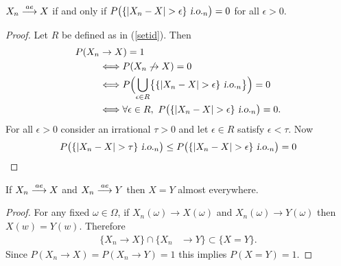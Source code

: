 \begin{theorem}[{\bf i.o. characterization}]\label{iochar}
$X_n\overset{\small ae} \longrightarrow X$ if and only if  $ P\bigl(\{|X_n - X| >\epsilon\} {\,\,\text{\sl i.o.} }_n\bigr) = 0$ for all $\epsilon >0$.
\end{theorem}
\begin{proof} Let $R$ be defined as in (\ref{setid}). Then
\begin{align*} 
P(X_n  &\rightarrow X )=1 \\
&\Longleftrightarrow P(X_n  \not\rightarrow X )= 0 \\
&\Longleftrightarrow  P\Bigl(\bigcup_{\epsilon \in R} \bigl\{\{|X_n - X| >\epsilon\} {\,\,\text{\sl i.o.} }_n \bigr\} \Bigr) = 0\\
&\Longleftrightarrow \forall \epsilon \in R,\,\,  P\bigl(\{|X_n - X| >\epsilon\} {\,\,\text{\sl i.o.} }_n\bigr) = 0.
\end{align*}
For all $\epsilon >0$ consider an irrational $\tau > 0$ and let $\epsilon\in R$ satisfy $\epsilon <\tau$. Now
\[P\bigl(\{|X_n - X| >\tau\} {\,\,\text{\sl i.o.} }_n\bigr) \leq  P\bigl(\{|X_n - X| >\epsilon\} {\,\,\text{\sl i.o.} }_n\bigr)=0\]
\end{proof}




\begin{theorem}
If  $X_n\overset{\small ae} \longrightarrow X$ and  $X_n\overset{\small ae} \longrightarrow Y$ then  $X=Y$ almost everywhere.
\end{theorem}
\begin{proof}
For any fixed $\omega \in \Omega$, if $X_n(\omega)\rightarrow X(\omega)$ and  $X_n(\omega)\rightarrow Y(\omega)$ then $X(w)=Y(w)$. Therefore
\begin{align*} 
\{X_n\rightarrow X\}\cap \{X_n &\rightarrow Y\}\subset \{X=Y\}.
\end{align*}
Since $P(X_n\rightarrow X)= P(X_n\rightarrow Y) = 1$ this implies $P(X=Y)=1$.
\end{proof}



